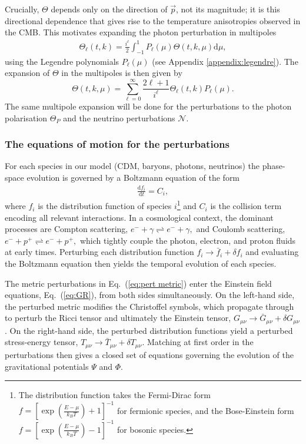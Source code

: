 \documentclass[twocolumn]{aa}
\renewcommand{\d}{\text{d}}
\newcommand{\dd}[2]{\frac{\d #1}{\d #2}}
\begin{document}
Crucially, $\Theta$ depends only on the direction of $\vec{p}$, not its magnitude; it is this directional dependence that gives rise to the temperature anisotropies observed in the CMB. This motivates expanding the photon perturbation in multipoles
\begin{align*}
      \Theta_\ell(t,k) = \frac{i^\ell}{2}\int_{-1}^1P_\ell (\mu) \Theta(t,k,\mu)\d \mu,
\end{align*}
using the Legendre polynomials $P_\ell(\mu)$ (see Appendix \ref{appendix:legendre}). The expansion of $\Theta$ in the multipoles is then given by
\begin{equation}
      \Theta(t,k,\mu) = \sum_{\ell=0}^{\infty}\frac{2\ell + 1}{i^\ell}\Theta_\ell(t,k)P_\ell(\mu).
      \label{eq:theta expansion}
\end{equation}
The same multipole expansion will be done for the perturbations to the photon polarisation $\Theta_P$ and the neutrino perturbations $\mathcal{N}$.

\subsubsection{The equations of motion for the perturbations}
\label{sec:pert eqs}

For each species in our model (CDM, baryons, photons, neutrinos) the phase-space evolution is governed by a Boltzmann equation of the form
\begin{align*}
    \dd{f_i}{t} = C_i,
\end{align*}
where $f_i$ is the distribution function of species $i$\footnote{The distribution function takes the Fermi-Dirac form $f = \left[\exp\!\left(\frac{E-\mu}{k_BT}\right)+1\right]^{-1}$ for fermionic species, and the Bose-Einstein form $f = \left[\exp\!\left(\frac{E-\mu}{k_BT}\right)-1\right]^{-1}$ for bosonic species.} and $C_i$ is the collision term encoding all relevant interactions. In a cosmological context, the dominant processes are Compton scattering,
$e^- +\gamma \rightleftharpoons e^- + \gamma,$
and Coulomb scattering,
$e^- + p^+ \rightleftharpoons e^- + p^+,$
which tightly couple the photon, electron, and proton fluids at early times. Perturbing each distribution function $f_i \to \bar{f}_i + \delta f_i$ and evaluating the Boltzmann equation then yields the temporal evolution of each species.

The metric perturbations in Eq.~(\ref{eq:pert metric}) enter the Einstein field equations, Eq.~(\ref{eq:GR}), from both sides simultaneously. On the left-hand side, the perturbed metric modifies the Christoffel symbols, which propagate through to perturb the Ricci tensor and ultimately the Einstein tensor, $G_{\mu\nu} \to \bar{G}_{\mu\nu} + \delta G_{\mu\nu}$. On the right-hand side, the perturbed distribution functions yield a perturbed stress-energy tensor, $T_{\mu\nu} \to \bar{T}_{\mu\nu} + \delta T_{\mu\nu}$. Matching at first order in the perturbations then gives a closed set of equations governing the evolution of the gravitational potentials $\Psi$ and $\Phi$.
\end{document}
